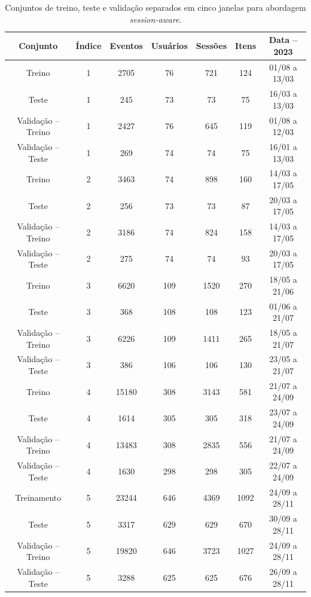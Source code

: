 \begin{table}
  \centering
  \begin{tabular}{|c|c|c|c|c|c|c|}
    \hline
    Conjunto & Índice & Eventos & Usuários & Sessões & Itens & Data -- 2023\\
    \hline
    Treino & 1 & 2705 & 76 & 721 & 124 & 01/08 a 13/03\\
    \hline
    Teste & 1 & 245 & 73 & 73 & 75 & 16/03 a 13/03\\
    \hline
    Validação -- Treino & 1 & 2427 & 76 & 645 & 119 & 01/08 a 12/03\\
    \hline
    Validação -- Teste & 1 & 269 & 74 & 74 & 75 & 16/01 a 13/03\\
    \hline
    Treino & 2 & 3463 & 74 & 898 & 160 & 14/03 a 17/05\\
    \hline
    Teste & 2 & 256 & 73 & 73 & 87 & 20/03 a 17/05\\
    \hline
    Validação -- Treino & 2 & 3186 & 74 & 824 & 158 & 14/03 a 17/05\\
    \hline
    Validação -- Teste & 2 & 275 & 74 & 74 & 93 & 20/03 a 17/05\\    
    \hline
    Treino & 3 & 6620 & 109 & 1520 & 270 & 18/05 a 21/06\\
    \hline
    Teste & 3 & 368 & 108 & 108 & 123 & 01/06 a 21/07\\
    \hline
    Validação -- Treino & 3 & 6226 & 109 & 1411 & 265 & 18/05 a 21/07\\
    \hline
    Validação -- Teste & 3 & 386 & 106 & 106 & 130 & 23/05 a 21/07\\
    \hline
    Treino & 4 & 15180 & 308 & 3143 & 581 & 21/07 a 24/09\\
    \hline
    Teste & 4 & 1614 & 305 & 305 & 318 & 23/07 a 24/09\\
    \hline
    Validação -- Treino & 4 & 13483 & 308 & 2835 & 556 & 21/07 a 24/09\\
    \hline
    Validação -- Teste & 4 & 1630 & 298 & 298 & 305 & 22/07 a 24/09\\
    \hline
    Treinamento & 5 & 23244 & 646 & 4369 & 1092 & 24/09 a 28/11\\
    \hline
    Teste & 5 & 3317 & 629 & 629 & 670 & 30/09 a 28/11\\
    \hline
    Validação -- Treino & 5 & 19820 & 646 & 3723 & 1027 & 24/09 a 28/11\\
    \hline
    Validação -- Teste & 5 & 3288 & 625 & 625 & 676 & 26/09 a 28/11\\
    \hline
  \end{tabular}
  \caption{Conjuntos de treino, teste e validação separados em cinco janelas para abordagem \textit{session-aware}.}
  \label{tab:windowed_data_session_aware}
\end{table}

